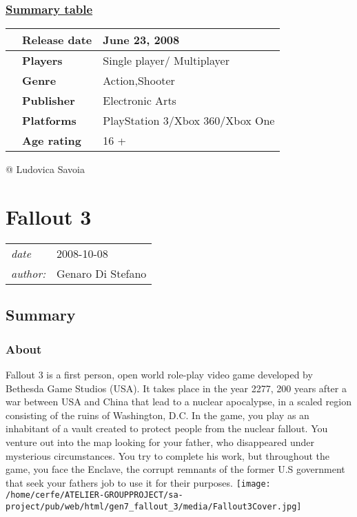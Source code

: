 \documentclass[a4paper,10pt]{book}
\newcommand{\pageHeader}[4]{
    \section{#1}
    \vspace{-0.3cm}
    \begin{table}[h!]
     \begin{tabular}{ll}
        \hline
        \textit{date} & #2 \\
        \textit{author: } & #3\\
        \hline
     \end{tabular}
    \end{table}
    \vspace{-0.3cm}
}
\begin{document}
 \subsubsection{\underline{Summary table }}
 \begin{longtable}{p{1mm}|l|l|}\hline
 
 & \textbf{Release date } 
 & June 23, 2008 
 \\\hline
 
 & \textbf{Players } 
 & Single player/ Multiplayer 
 \\\hline
 
 & \textbf{Genre } 
 & Action,Shooter 
 \\\hline
 
 & \textbf{Publisher } 
 & Electronic Arts 
 \\\hline
 
 & \textbf{Platforms } 
 & PlayStation 3/Xbox 360/Xbox One 
 \\\hline
 
 & \textbf{Age rating } 
 & 16 + 
 \\\hline
 \end{longtable}
 
 @ Ludovica Savoia 
 
 \newpage\pageHeader{Fallout 3}{2008-10-08}{Genaro Di Stefano}{Fallout 3: the major shift in the series}
 \subsection{Summary }
 \subsubsection{About }
 
          Fallout 3 is a first person, open world role-play video game developed by Bethesda Game Studios (USA). It takes place in the year 2277, 200 years after a war between USA and China that lead to a nuclear apocalypse, in a scaled region consisting of the ruins of Washington, D.C. In the game, you play as an inhabitant of a vault created to protect people from the nuclear fallout. You venture out into the map looking for your father, who disappeared under mysterious circumstances. You try to complete his work, but throughout the game, you face the Enclave, the corrupt remnants of the former U.S government that seek your fathers job to use it for their purposes.
          \texttt{[image: /home/cerfe/ATELIER-GROUPPROJECT/sa-project/pub/web/html/gen7\_fallout\_3/media/Fallout3Cover.jpg]}
   
\end{document}
